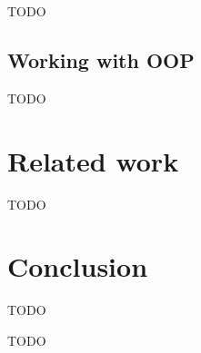 \documentclass[acmsmall]{acmart}
\begin{document}
TODO %

\subsection{Working with OOP}

TODO %




\section{Related work} \label{sec:related}



TODO %



\section{Conclusion} \label{sec:conclusion}

TODO %


\begin{acks}
    TODO %
\end{acks}




\end{document}
